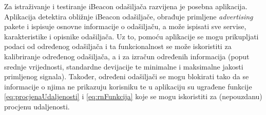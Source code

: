Za istraživanje i testiranje iBeacon odašiljača razvijena je posebna aplikacija. 
Aplikacija detektira obližnje iBeacon odašiljače, obrađuje primljene \textit{advertising} pakete i ispisuje osnovne informacije o odašiljaču, a može ispisati sve servise, karakteristike i opisnike odašiljača. 
Uz to, pomoću aplikacije se mogu prikupljati podaci od određenog odašiljača i ta funkcionalnost se može iskoristiti za kalibriranje određenog odašiljača, a i za izračun određenih informacija (poput srednje vrijednosti, standardne devijacije te minimalne i maksimalne jakosti primljenog signala). 
Također, određeni odašiljači se mogu blokirati tako da se informacije o njima ne prikazuju korisniku te u aplikaciju su ugrađene funkcije \eqref{eq:procjenaUdaljenosti} i \eqref{eq:rnFunkcija} koje se mogu iskoristiti za (nepouzdanu) procjenu udaljenosti.

